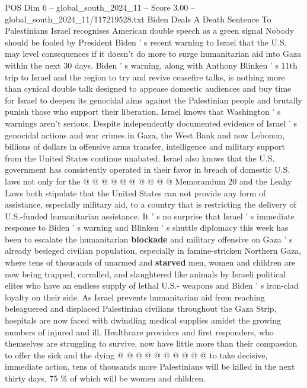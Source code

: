 \begin{textsample}{POS Dim 6 – global\_south\_2024\_11 – Score 3.00 – global\_south\_2024\_11/117219528.txt}  \label{ex:f6_pos_394}
Biden Deals A Death Sentence To Palestinians Israel recognises American double speech as a green signal Nobody should be fooled by President Biden ' s recent warning to Israel that the U.S. may level consequences if it doesn't do more to surge humanitarian aid into Gaza within the next 30 days.
Biden ' s warning, along with Anthony Blinken ' s 11th trip to Israel and the region to try and revive ceasefire talks, is nothing more than cynical double talk designed to appease domestic audiences and buy time for Israel to deepen its genocidal aims against the Palestinian people and brutally punish those who support their liberation.
Israel knows that Washington ' s warnings aren't serious.
Despite independently documented evidence of Israel ' s genocidal actions and war crimes in Gaza, the West Bank and now Lebonon, billions of dollars in offensive arms transfer, intelligence and military support from the United States continue unabated.
Israel also knows that the U.S. government has consistently operated in their favor in breach of domestic U.S. laws not only for the @ @ @ @ @ @ @ @ @ @ Memorandum 20 and the Leahy Laws both stipulate that the United States can not provide any form of assistance, especially military aid, to a country that is restricting the delivery of U.S.-funded humanitarian assistance.
It ' s no surprise that Israel ' s immediate response to Biden ' s warning and Blinken ' s shuttle diplomacy this week has been to escalate the humanitarian \textbf{blockade} and military offensive on Gaza ' s already besieged civilian population, especially in famine-stricken Northern Gaza, where tens of thousands of unarmed and \textbf{starved} men, women and children are now being trapped, corralled, and slaughtered like animals by Israeli political elites who have an endless supply of lethal U.S.- weapons and Biden ' s iron-clad loyalty on their side.
As Israel prevents humanitarian aid from reaching beleaguered and displaced Palestinian civilians throughout the Gaza Strip, hospitals are now faced with dwindling medical supplies amidst the growing numbers of injured and ill.
Healthcare providers and first responders, who themselves are struggling to survive, now have little more than their compassion to offer the sick and the dying @ @ @ @ @ @ @ @ @ @ to take decisive, immediate action, tens of thousands more Palestinians will be killed in the next thirty days, 75 \% of which will be women and children.

\end{textsample}
